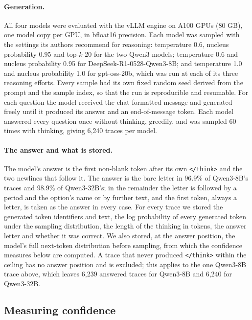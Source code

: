 \documentclass[11pt]{article}
\begin{document}
\paragraph{Generation.}
All four models were evaluated with the vLLM engine \citep{kwon2023efficient} on A100 GPUs (80 GB), one model copy per GPU, in bfloat16 precision. Each model was sampled with the settings its authors recommend for reasoning: temperature 0.6, nucleus probability 0.95 and top-$k$ 20 for the two Qwen3 models; temperature 0.6 and nucleus probability 0.95 for DeepSeek-R1-0528-Qwen3-8B; and temperature 1.0 and nucleus probability 1.0 for gpt-oss-20b, which was run at each of its three reasoning efforts. Every sample had its own fixed random seed derived from the prompt and the sample index, so that the run is reproducible and resumable. For each question the model received the chat-formatted message and generated freely until it produced its answer and an end-of-message token. Each model answered every question once without thinking, greedily, and was sampled 60 times with thinking, giving 6,240 traces per model.

\paragraph{The answer and what is stored.}
The model's answer is the first non-blank token after its own \texttt{</think>} and the two newlines that follow it. The answer is the bare letter in 96.9\% of Qwen3-8B's traces and 98.9\% of Qwen3-32B's; in the remainder the letter is followed by a period and the option's name or by further text, and the first token, always a letter, is taken as the answer in every case. For every trace we stored the generated token identifiers and text, the log probability of every generated token under the sampling distribution, the length of the thinking in tokens, the answer letter and whether it was correct. We also stored, at the answer position, the model's full next-token distribution before sampling, from which the confidence measures below are computed. A trace that never produced \texttt{</think>} within the ceiling has no answer position and is excluded; this applies to the one Qwen3-8B trace above, which leaves 6,239 answered traces for Qwen3-8B and 6,240 for Qwen3-32B.

\subsection{Measuring confidence}
\label{sec:confidence}
\end{document}
